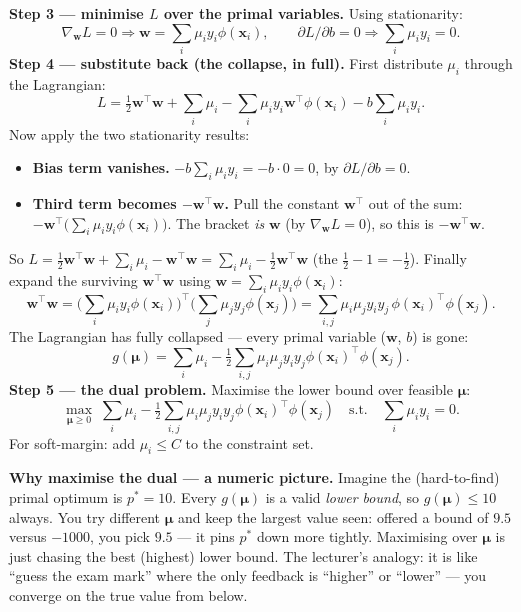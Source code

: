 \documentclass[11pt, a4paper]{article}
\begin{document}
\textbf{Step 3 — minimise $L$ over the primal variables.} Using stationarity:
\[
\nabla_\mathbf{w} L = 0 \Rightarrow \mathbf{w} = \sum_i \mu_i y_i \phi(\mathbf{x}_i), \qquad
\partial L / \partial b = 0 \Rightarrow \sum_i \mu_i y_i = 0.
\]
\textbf{Step 4 — substitute back (the collapse, in full).} First distribute $\mu_i$ through the Lagrangian:
\[
L = \tfrac12\mathbf{w}^\top\mathbf{w} + \sum_i\mu_i - \sum_i\mu_i y_i\mathbf{w}^\top\phi(\mathbf{x}_i) - b\sum_i\mu_i y_i.
\]
Now apply the two stationarity results:
\begin{itemize}
  \item \textbf{Bias term vanishes.} $-b\sum_i\mu_i y_i = -b\cdot 0 = 0$, by $\partial L/\partial b = 0$.
  \item \textbf{Third term becomes $-\mathbf{w}^\top\mathbf{w}$.} Pull the constant $\mathbf{w}^\top$ out of the sum: $-\mathbf{w}^\top\big(\sum_i\mu_i y_i\phi(\mathbf{x}_i)\big)$. The bracket \emph{is} $\mathbf{w}$ (by $\nabla_\mathbf{w}L=0$), so this is $-\mathbf{w}^\top\mathbf{w}$.
\end{itemize}
So $L = \tfrac12\mathbf{w}^\top\mathbf{w} + \sum_i\mu_i - \mathbf{w}^\top\mathbf{w} = \sum_i\mu_i - \tfrac12\mathbf{w}^\top\mathbf{w}$ (the $\tfrac12 - 1 = -\tfrac12$). Finally expand the surviving $\mathbf{w}^\top\mathbf{w}$ using $\mathbf{w} = \sum_i\mu_i y_i\phi(\mathbf{x}_i)$:
\[
\mathbf{w}^\top\mathbf{w} = \Big(\sum_i\mu_i y_i\phi(\mathbf{x}_i)\Big)^\top\Big(\sum_j\mu_j y_j\phi(\mathbf{x}_j)\Big) = \sum_{i,j}\mu_i\mu_j y_i y_j\,\phi(\mathbf{x}_i)^\top\phi(\mathbf{x}_j).
\]
The Lagrangian has fully collapsed — every primal variable ($\mathbf{w}$, $b$) is gone:
\[
g(\boldsymbol\mu) = \sum_i \mu_i - \tfrac{1}{2}\sum_{i, j} \mu_i \mu_j y_i y_j \phi(\mathbf{x}_i)^\top\phi(\mathbf{x}_j).
\]
\textbf{Step 5 — the dual problem.} Maximise the lower bound over feasible $\boldsymbol\mu$:
\[
\boxed{\;\max_{\boldsymbol\mu \ge 0}\;\sum_i \mu_i - \tfrac{1}{2}\sum_{i,j}\mu_i\mu_j y_i y_j\phi(\mathbf{x}_i)^\top\phi(\mathbf{x}_j) \quad\text{s.t.}\quad \sum_i \mu_i y_i = 0.\;}
\]
For soft-margin: add $\mu_i \le C$ to the constraint set.

\begin{notebox}
\textbf{Why maximise the dual — a numeric picture.} Imagine the (hard-to-find) primal optimum is $p^* = 10$. Every $g(\boldsymbol\mu)$ is a valid \emph{lower bound}, so $g(\boldsymbol\mu) \le 10$ always. You try different $\boldsymbol\mu$ and keep the largest value seen: offered a bound of $9.5$ versus $-1000$, you pick $9.5$ — it pins $p^*$ down more tightly. Maximising over $\boldsymbol\mu$ is just chasing the best (highest) lower bound. The lecturer's analogy: it is like ``guess the exam mark'' where the only feedback is ``higher'' or ``lower'' — you converge on the true value from below.
\end{notebox}
\end{document}
